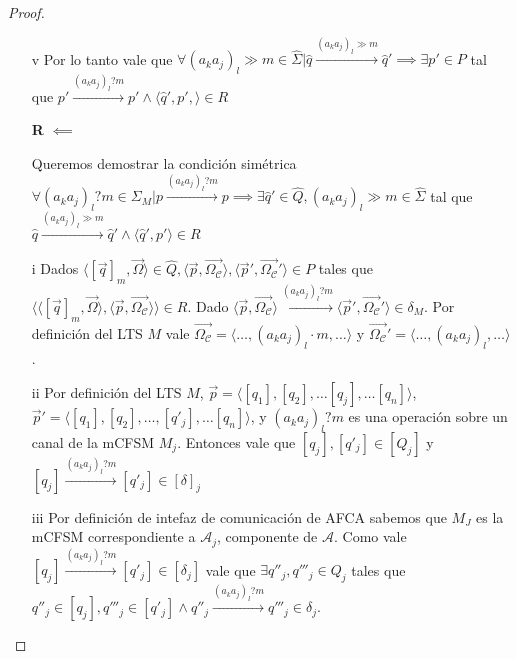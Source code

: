 \begin{proof}
\begin{itemize}
    \item[v] Por lo tanto vale que $\forall (a_ka_j)_l \gg m \in \hat{\Sigma} | \hat{q} \xrightarrow{(a_ka_j)_l \gg m} \hat{q}' \implies \exists p' \in P$ tal que $p' \xrightarrow{(a_ka_j)_l?m} p' \land \langle \hat{q}', p', \rangle \in R$
    
    \item[\textbf{R} $\impliedby$]
    
    \item[] Queremos demostrar la condición simétrica $\forall (a_ka_j)_l?m \in \Sigma_M | p \xrightarrow{(a_ka_j)_l?m} p \implies \exists \hat{q}' \in \hat{Q}, (a_ka_j)_l \gg m \in \hat{\Sigma}$ tal que $\hat{q} \xrightarrow{(a_ka_j)_l \gg m} \hat{q}' \land \langle \hat{q}', p'\rangle \in R$
    
    \item[i]Dados $\langle [\overrightarrow{q}]_m, \overrightarrow{\Omega} \rangle \in \hat{Q}, \langle \overrightarrow{p}, \overrightarrow{\Omega_\mathcal{C}} \rangle, \langle \overrightarrow{p}', \overrightarrow{\Omega_\mathcal{C}}' \rangle \in P$ tales que $\langle \langle [\overrightarrow{q}]_m, \overrightarrow{\Omega} \rangle, \langle \overrightarrow{p}, \overrightarrow{\Omega_\mathcal{C}} \rangle \rangle \in R$. Dado $\langle \overrightarrow{p}, \overrightarrow{\Omega_\mathcal{C}} \rangle \xrightarrow{(a_ka_j)_l?m} \langle \overrightarrow{p}', \overrightarrow{\Omega_\mathcal{C}}' \rangle \in \delta_M$. Por definición del LTS $M$ vale $\overrightarrow{\Omega_{\mathcal{C}}}= \langle \ldots,(a_ka_j)_l \cdot m, \ldots \rangle$ y $\overrightarrow{\Omega_{\mathcal{C}}}'= \langle \ldots,(a_ka_j)_l, \ldots \rangle$.
    
    \item[ii] Por definición del LTS $M$, $\overrightarrow{p}=\langle [q_1], [q_2], \ldots [q_j], \ldots [q_n] \rangle$, $\overrightarrow{p}'= \langle [q_1], [q_2], \ldots, [q'_j], \ldots [q_n] \rangle$, y $(a_ka_j)_l?m$ es una operación sobre un canal de la mCFSM $M_j$. Entonces vale que $[q_j],[q'_j] \in [Q_j]$ y $[q_j] \xrightarrow{(a_ka_j)_l?m} [q'_j] \in [\delta]_j$
    
    \item[iii] Por definición de intefaz de comunicación de AFCA sabemos que $M_J$ es la mCFSM correspondiente a $\mathcal{A}_j$, componente de $\mathcal{A}$. Como vale $[q_j] \xrightarrow{(a_ka_j)_l?m} [q'_j] \in [\delta_j]$ vale que $\exists q''_j,q'''_j \in Q_j$ tales que $q''_j \in [q_j], q'''_j \in [q'_j] \land q''_j \xrightarrow{(a_ka_j)_l?m} q'''_j \in \delta_j$. 
    

\end{itemize}
\end{proof}
